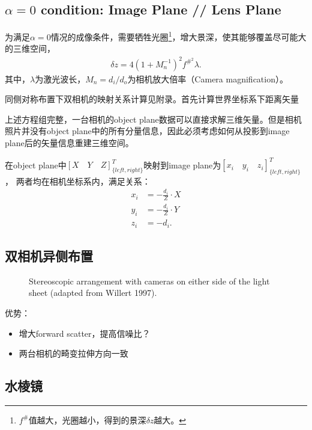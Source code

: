 \documentclass{article}
\begin{document}
\subsection{$\alpha = 0$ condition: Image Plane // Lens Plane}

为满足$\alpha = 0$情况的成像条件，需要牺牲光圈\footnote{$f^{\#}$值越大，光圈越小，得到的景深$\delta z$越大。}，增大景深，使其能够覆盖尽可能大的三维空间， 
\begin{align}
\delta z = 4 (1 + M_n^{- 1})^2 f^{\#^2} \lambda .
\end{align}
其中，$\lambda$为激光波长，$M_n = d_i / d_o$为相机放大倍率（Camera magnification）。

同侧对称布置下双相机的映射关系计算见附录。首先计算世界坐标系下距离矢量

上述方程组完整，一台相机的object plane数据可以直接求解三维矢量。但是相机照片并没有object plane中的所有分量信息，因此必须考虑如何从投影到image plane后的矢量信息重建三维空间。

在object plane中$\left[ X \quad Y \quad Z \right]_{\{ {left}, {right} \}}^T$映射到image plane为$\left[ x_i \quad y_i \quad z_i
\right]^T_{\{  {left},  {right} \}}$， 两者均在相机坐标系内，满足关系：
   $$
   \begin{aligned}
    x_i & =  - \frac{d_i}{Z} \cdot X\\
     y_i & =  - \frac{d_i}{Z} \cdot Y\\
     z_i & =  - d_{i}.
   \end{aligned}
   $$

\subsection{双相机异侧布置}

\begin{figure}[htbp]
  \centering
  \caption{Stereoscopic arrangement with cameras on either side of the light
  sheet (adapted from Willert 1997).}
\end{figure}

优势：
\begin{itemize}
  \item 增大forward scatter，提高信噪比？
  
  \item 两台相机的畸变拉伸方向一致
\end{itemize}

\subsection{水棱镜}
\end{document}
